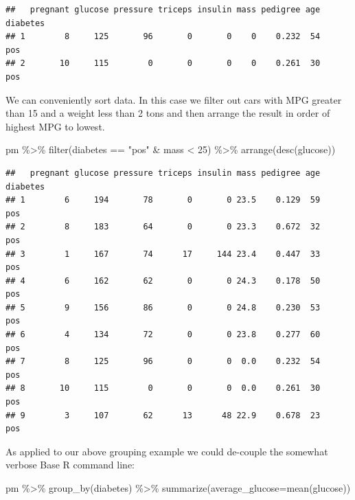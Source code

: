 \documentclass[
]{article}
\newenvironment{Shaded}{\begin{snugshade}}{\end{snugshade}}
\newcommand{\AttributeTok}[1]{\textcolor[rgb]{0.77,0.63,0.00}{#1}}
\newcommand{\DecValTok}[1]{\textcolor[rgb]{0.00,0.00,0.81}{#1}}
\newcommand{\FunctionTok}[1]{\textcolor[rgb]{0.00,0.00,0.00}{#1}}
\newcommand{\NormalTok}[1]{#1}
\newcommand{\SpecialCharTok}[1]{\textcolor[rgb]{0.00,0.00,0.00}{#1}}
\newcommand{\StringTok}[1]{\textcolor[rgb]{0.31,0.60,0.02}{#1}}
\begin{document}
\begin{verbatim}
##   pregnant glucose pressure triceps insulin mass pedigree age diabetes
## 1        8     125       96       0       0    0    0.232  54      pos
## 2       10     115        0       0       0    0    0.261  30      pos
\end{verbatim}

We can conveniently sort data. In this case we filter out cars with MPG
greater than 15 and a weight less than 2 tons and then arrange the
result in order of highest MPG to lowest.

\begin{Shaded}
\begin{Highlighting}[]
\NormalTok{pm }\SpecialCharTok{\%\textgreater{}\%} \FunctionTok{filter}\NormalTok{(diabetes }\SpecialCharTok{==} \StringTok{"pos"} \SpecialCharTok{\&}\NormalTok{ mass }\SpecialCharTok{\textless{}} \DecValTok{25}\NormalTok{) }\SpecialCharTok{\%\textgreater{}\%} \FunctionTok{arrange}\NormalTok{(}\FunctionTok{desc}\NormalTok{(glucose))}
\end{Highlighting}
\end{Shaded}

\begin{verbatim}
##   pregnant glucose pressure triceps insulin mass pedigree age diabetes
## 1        6     194       78       0       0 23.5    0.129  59      pos
## 2        8     183       64       0       0 23.3    0.672  32      pos
## 3        1     167       74      17     144 23.4    0.447  33      pos
## 4        6     162       62       0       0 24.3    0.178  50      pos
## 5        9     156       86       0       0 24.8    0.230  53      pos
## 6        4     134       72       0       0 23.8    0.277  60      pos
## 7        8     125       96       0       0  0.0    0.232  54      pos
## 8       10     115        0       0       0  0.0    0.261  30      pos
## 9        3     107       62      13      48 22.9    0.678  23      pos
\end{verbatim}

As applied to our above grouping example we could de-couple the somewhat
verbose Base R command line:

\begin{Shaded}
\begin{Highlighting}[]
\NormalTok{pm }\SpecialCharTok{\%\textgreater{}\%} \FunctionTok{group\_by}\NormalTok{(diabetes) }\SpecialCharTok{\%\textgreater{}\%} \FunctionTok{summarize}\NormalTok{(}\AttributeTok{average\_glucose=}\FunctionTok{mean}\NormalTok{(glucose))}
\end{Highlighting}
\end{Shaded}
\end{document}
